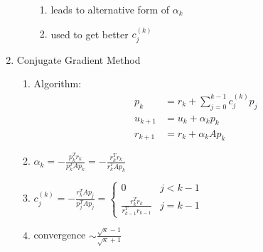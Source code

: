 \documentclass[10pt]{extarticle}
\begin{document}
\begin{minipage}[t][0.5\textheight][t]{\textwidth}
\begin{multicols}{2}
\begin{enumerate}
\begin{enumerate}
\begin{enumerate}
			\item leads to alternative form of $\alpha_k$
			\item used to get better $c_j^{(k)}$
		\end{enumerate}
	\end{enumerate}
	\item Conjugate Gradient Method
	\begin{enumerate}
		\item Algorithm:
			\begin{align*}
				p_k &= r_k + \sum_{j=0}^{k-1}c_j^{(k)}p_j \\
				u_{k+1} &= u_k + \alpha_k p_k \\
				r_{k+1} &= r_k + \alpha_k A p_k
			\end{align*}
		\item $\alpha_k = -\frac{p_k^Tr_k}{p_k^TAp_k} = -\frac{r_k^Tr_k}{r_k^TAp_k}$
		\item $c_j^{(k)} = -\frac{r_k^TAp_j}{p_j^TAp_j} = \begin{cases}
				0 & j < k-1 \\
				\frac{r_k^Tr_k}{r_{k-1}^Tr_{k-1}} & j = k-1
			\end{cases}$
		\item convergence $\sim \frac{\sqrt{\kappa}-1}{\sqrt{\kappa}+1}$
	\end{enumerate}
\end{enumerate}
\end{multicols}
\end{minipage}
\end{document}
